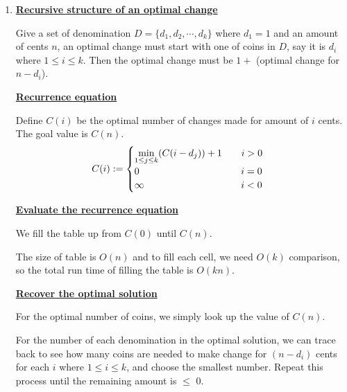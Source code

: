 \documentclass[11pt]{article}
\begin{document}
\begin{enumerate}
\begin{enumerate}
\begin{proof}
    Also, by the lemma, the largest possible value for the partial
    amount $B$ is:
    \begin{align}
      \sum_{i=0}^{j-1} c_i' a^i &= (a-1)a^0 + (a-1)a^1 + \cdots +
      (a-1)a^{j-1}\\
      &= (a-1)\sum_{i=0}^{j-1} a^i\\
      &= (a-1)\frac{1-a^j}{1-a}\\
      &= a^j - 1\\
      &< a^j
    \end{align}

    This contradicts the fact that $B \geq a^j$. Thus $A$ must be an
    optimal solution.    
  \end{proof}

\item %

  \underline{\textbf{Recursive structure of an optimal change}}

  Give a set of denomination $D = \{d_1,d_2,\cdots,d_k\}$ where $d_1 =
  1$ and an amount of cents $n$, an optimal change must start with one
  of coins in $D$, say it is 
  $d_i$ where $1 \leq i \leq k$. Then the optimal change must be $1+$
  (optimal change for $n-d_i$).

  \underline{\textbf{Recurrence equation}}

  Define $C(i)$ be the optimal number of changes made for amount of $i$
  cents. The goal value is $C(n)$.
  \begin{equation}
    C(i) := \begin{cases}
      \min\limits_{1 \leq j \leq k}(C(i-d_j)) + 1 \-\hspace{2em} i > 0\\
      0 \-\hspace{10.5em} i = 0\\
      \infty \-\hspace{10em} i < 0
    \end{cases}
  \end{equation}

  \underline{\textbf{Evaluate the recurrence equation}}

  We fill the table up from $C(0)$ until $C(n)$.

  The size of table is $O(n)$ and to fill each cell, we need $O(k)$
  comparison, so the total run time of filling the table is $O(kn)$.

  \underline{\textbf{Recover the optimal solution}}

  For the optimal number of coins, we simply look up the value of
  $C(n)$. 

  For the number of each denomination in the optimal solution, we can
  trace back to see how many coins are needed to make change for
  $(n-d_i)$ cents for each $i$ where $1 \leq i \leq k$, and choose the
  smallest number. Repeat this process until the remaining amount
  is $\leq$ 0.

\end{enumerate}

\end{enumerate}
\end{document}
